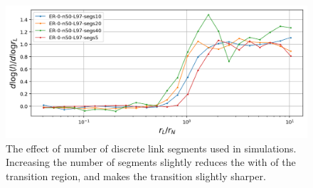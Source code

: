 \documentclass[endfloats,nofootinbib,preprint,floatfix,titlepage,superscriptaddress,linenumbers]{revtex4-1} %
\newcommand{\finV}[2]{#1}
\begin{document}
{\begin{figure}
    \centering
    \includegraphics[width=.7\textwidth]{fig-09-19/ER-segs.png}
    \caption{\scriptsize The effect of number of discrete link segments used in simulations.
    Increasing the number of segments slightly reduces the with of the transition region, and makes the transition slightly sharper. 
    }
    \label{fig:er-segs}
\end{figure}
}%

\finV{
\newpage
\newpage
\setcounter{page}{9}
}{


}
\end{document}
